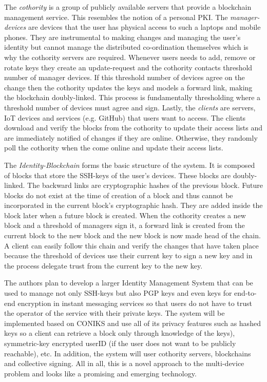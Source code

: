 The \textit{cothority} is a group of publicly available servers that provide a blockchain management service. This resembles the notion of a personal PKI. The \textit{manager-devices} are devices that the user has physical access to such a laptops and mobile phones. They are instrumental to making changes and managing the user's identity but cannot manage the distributed co-ordination themselves which is why the cothority servers are required. Whenever users needs to add, remove or rotate keys they create an update-request and the cothority contacts  threshold number of manager devices. If this threshold number of devices agree on the change then the cothority updates the keys and models a forward link, making the blockchain doubly-linked. This process is fundamentally thresholding where a threshold number of devices must agree and sign. Lastly, the \textit{clients} are servers, IoT devices and services (e.g. GitHub) that users want to access. The clients download and verify the blocks from the cothority to update their access lists and are immediately notified of changes if they are online. Otherwise, they randomly poll the cothority when the come online and update their access lists.

The \textit{Identity-Blockchain} forms the basic structure of the system. It is composed of blocks that store the SSH-keys of the user's devices. These blocks are doubly-linked. The backward links are cryptographic hashes of the previous block. Future blocks do not exist at the time of creation of a block and thus cannot be incorporated in the current block's cryptographic hash. They are added inside the block later when a future block is created. When the cothority creates a new block and a threshold of managers sign it, a forward link is created from the current block to the new block and the new block is now made head of the chain. A client can easily follow this chain and verify the changes that have taken place because the threshold of devices use their current key to sign a new key and in the process delegate trust from the current key to the new key.

The authors plan to develop a larger Identity Management System that can be used to manage not only SSH-keys but also PGP keys and even keys for end-to-end encryption in instant messaging services so that users do not have to trust the operator of the service with their private keys. The system will be implemented based on CONIKS and use all of its privacy features such as hashed keys so a client can retrieve a block only through knowledge of the keys), symmetric-key encrypted userID (if the user does not want to be publicly reachable), etc. In addition, the system will user cothority servers, blockchains and collective signing. All in all, this is a novel approach to the multi-device problem and looks like a promising and emerging technology.


